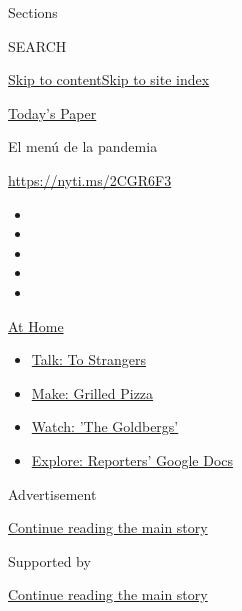 Sections

SEARCH

\protect\hyperlink{site-content}{Skip to
content}\protect\hyperlink{site-index}{Skip to site index}

\href{https://myaccount.nytimes.com/auth/login?response_type=cookie\&client_id=vi}{}

\href{https://www.nytimes.com/section/todayspaper}{Today's Paper}

El menú de la pandemia

\url{https://nyti.ms/2CGR6F3}

\begin{itemize}
\item
\item
\item
\item
\item
\end{itemize}

\href{https://www.nytimes.com/spotlight/at-home?action=click\&pgtype=Article\&state=default\&region=TOP_BANNER\&context=at_home_menu}{At
Home}

\begin{itemize}
\tightlist
\item
  \href{https://www.nytimes.com/2020/08/03/well/family/the-benefits-of-talking-to-strangers.html?action=click\&pgtype=Article\&state=default\&region=TOP_BANNER\&context=at_home_menu}{Talk:
  To Strangers}
\item
  \href{https://www.nytimes.com/2020/08/01/at-home/coronavirus-make-pizza-on-a-grill.html?action=click\&pgtype=Article\&state=default\&region=TOP_BANNER\&context=at_home_menu}{Make:
  Grilled Pizza}
\item
  \href{https://www.nytimes.com/2020/07/31/arts/television/goldbergs-abc-stream.html?action=click\&pgtype=Article\&state=default\&region=TOP_BANNER\&context=at_home_menu}{Watch:
  'The Goldbergs'}
\item
  \href{https://www.nytimes.com/interactive/2020/at-home/even-more-reporters-editors-diaries-lists-recommendations.html?action=click\&pgtype=Article\&state=default\&region=TOP_BANNER\&context=at_home_menu}{Explore:
  Reporters' Google Docs}
\end{itemize}

Advertisement

\protect\hyperlink{after-top}{Continue reading the main story}

Supported by

\protect\hyperlink{after-sponsor}{Continue reading the main story}

